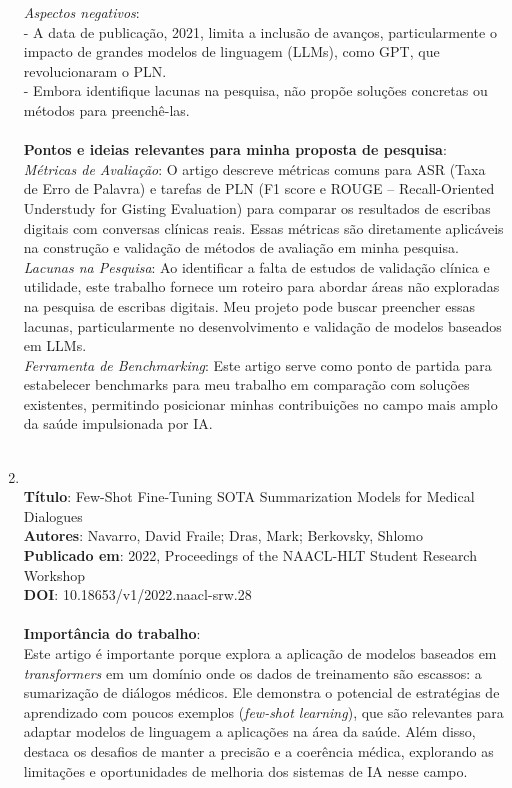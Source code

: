\documentclass[
	article,
	11pt,
	oneside,
	a4paper,
	english,
	brazil,
	sumario=tradicional
	]{abntex2}
\begin{document}
\begin{enumerate}
\textit{Aspectos negativos}:\\
- A data de publicação, 2021, limita a inclusão de avanços, particularmente o impacto de grandes modelos de linguagem (LLMs), como GPT, que revolucionaram o PLN.\\
- Embora identifique lacunas na pesquisa, não propõe soluções concretas ou métodos para preenchê-las.\\
\\
\textbf{Pontos e ideias relevantes para minha proposta de pesquisa}:\\
\textit{Métricas de Avaliação}: O artigo descreve métricas comuns para ASR (Taxa de Erro de Palavra) e tarefas de PLN (F1 score e ROUGE -- Recall-Oriented Understudy for Gisting Evaluation) para comparar os resultados de escribas digitais com conversas clínicas reais. Essas métricas são diretamente aplicáveis na construção e validação de métodos de avaliação em minha pesquisa.\\
\textit{Lacunas na Pesquisa}: Ao identificar a falta de estudos de validação clínica e utilidade, este trabalho fornece um roteiro para abordar áreas não exploradas na pesquisa de escribas digitais. Meu projeto pode buscar preencher essas lacunas, particularmente no desenvolvimento e validação de modelos baseados em LLMs.\\
\textit{Ferramenta de Benchmarking}: Este artigo serve como ponto de partida para estabelecer benchmarks para meu trabalho em comparação com soluções existentes, permitindo posicionar minhas contribuições no campo mais amplo da saúde impulsionada por IA.
\\ \\
\item \cite{navarro2022few}
\\
\textbf{Título}: Few-Shot Fine-Tuning SOTA Summarization Models for Medical Dialogues
\\
\textbf{Autores}: Navarro, David Fraile; Dras, Mark; Berkovsky, Shlomo 
\\
\textbf{Publicado em}: 2022, Proceedings of the NAACL-HLT Student Research Workshop
\\
\textbf{DOI}: 10.18653/v1/2022.naacl-srw.28
\\
\\
\textbf{Importância do trabalho}:
\\
Este artigo é importante porque explora a aplicação de modelos baseados em \textit{transformers} em um domínio onde os dados de treinamento são escassos: a sumarização de diálogos médicos. Ele demonstra o potencial de estratégias de aprendizado com poucos exemplos (\textit{few-shot learning}), que são relevantes para adaptar modelos de linguagem a aplicações na área da saúde. Além disso, destaca os desafios de manter a precisão e a coerência médica, explorando as limitações e oportunidades de melhoria dos sistemas de IA nesse campo.

\end{enumerate}
\end{document}
